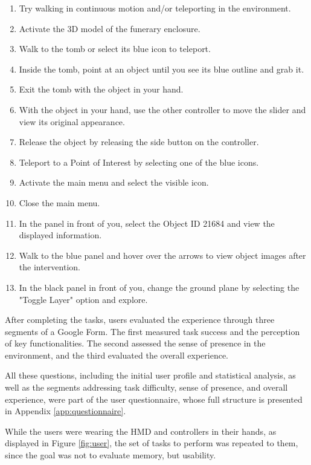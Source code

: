 \begin{enumerate}
\item{Try walking in continuous motion and/or teleporting in the environment.}
\item{Activate the 3D model of the funerary enclosure.}
\item{Walk to the tomb or select its blue icon to teleport.}
\item{Inside the tomb, point at an object until you see its blue outline and grab it.}
\item{Exit the tomb with the object in your hand.}
\item{With the object in your hand, use the other controller to move the slider and view its original appearance.}
\item{Release the object by releasing the side button on the controller.}
\item{Teleport to a Point of Interest by selecting one of the blue icons.}
\item{Activate the main menu and select the visible icon.}
\item{Close the main menu.}
\item{In the panel in front of you, select the Object \gls{ID} 21684 and view the displayed information.}
\item{Walk to the blue panel and hover over the arrows to view object images after the intervention.}
\item{In the black panel in front of you, change the ground plane by selecting the "Toggle Layer" option and explore.}
\end{enumerate}

After completing the tasks, users evaluated the experience through three segments of a Google Form. The first measured task success and the perception of key functionalities. 
The second assessed the sense of presence in the environment, and the third evaluated the overall experience. 

All these questions, including the initial user profile and statistical analysis, as well as the segments addressing task difficulty, sense of presence, and overall experience, were part of the user questionnaire, whose full structure is presented in Appendix \ref{app:questionnaire}.

While the users were wearing the \gls{HMD} and controllers in their hands, as displayed in Figure \ref{fig:user}, the set of tasks to perform was repeated to them, since the goal was not to evaluate memory, but usability.


